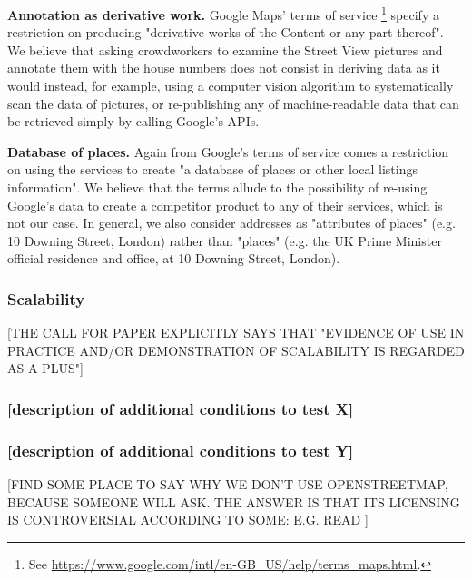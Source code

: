     \textbf{Annotation as derivative work.} Google Maps' terms of service \footnote{See \url{https://www.google.com/intl/en-GB_US/help/terms_maps.html}.} specify a restriction on producing "derivative works of the Content or any part thereof". We believe that asking crowdworkers to examine the Street View pictures and annotate them with the house numbers does not consist in deriving data as it would instead, for example, using a computer vision algorithm to systematically scan the data of pictures, or re-publishing any of machine-readable data that can be retrieved simply by calling Google's APIs. 
    
    \textbf{Database of places.} Again from Google's terms of service comes a restriction on using the services to create "a database of places or other local listings information". We believe that the terms allude to the possibility of re-using Google's data to create a competitor product to any of their services, which is not our case. In general, we also consider addresses as "attributes of places" (e.g. 10 Downing Street, London) rather than "places" (e.g. the UK Prime Minister official residence and office, at 10 Downing Street, London).
    	
    \subsubsection{Scalability}
    
        [THE CALL FOR PAPER EXPLICITLY SAYS THAT "EVIDENCE OF USE IN PRACTICE AND/OR DEMONSTRATION OF SCALABILITY IS REGARDED AS A PLUS"]
    
    \subsubsection{{[}description of additional conditions to test X{]}}
    \subsubsection{{[}description of additional conditions to test Y{]}}

[FIND SOME PLACE TO SAY WHY WE DON'T USE OPENSTREETMAP, BECAUSE SOMEONE WILL ASK. THE ANSWER IS THAT ITS LICENSING IS CONTROVERSIAL ACCORDING TO SOME: E.G. READ \cite{CentreforSpatialLawandPolicy:2014tx}]
    

